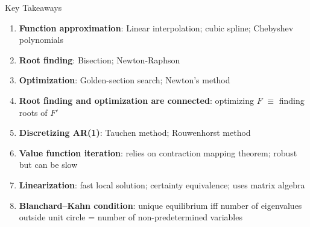 \documentclass[blue]{beamer}
\begin{document}
\begin{frame}{Key Takeaways}
	\begin{enumerate}
		\item \textbf{Function approximation}: Linear interpolation; cubic spline; Chebyshev polynomials
		
		\item \textbf{Root finding}: Bisection; Newton-Raphson 
		
		\item \textbf{Optimization}: Golden-section search; Newton's method
		
		\item \textbf{Root finding and optimization are connected}: optimizing $F$ $\equiv$ finding roots of $F'$
		
		\item \textbf{Discretizing AR(1)}: Tauchen method; Rouwenhorst method
		
		\item \textbf{Value function iteration}: relies on contraction mapping theorem; robust but can be slow
		
		\item \textbf{Linearization}: fast local solution; certainty equivalence; uses matrix algebra 
		
		\item \textbf{Blanchard--Kahn condition}: unique equilibrium iff number of eigenvalues outside unit circle = number of non-predetermined variables
	\end{enumerate}
\end{frame}
\end{document}
